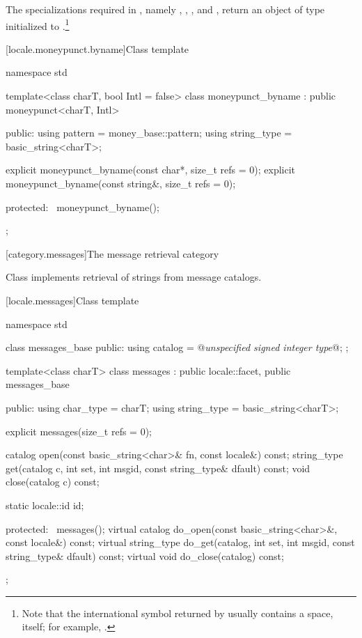 \begin{itemdescr}
\pnum
\returns
The specializations required in , namely
,
,
,
and
,
return an object of type
initialized to
.\footnote{Note that the international
symbol returned by
usually contains a space, itself;
for example, .}
\end{itemdescr}

[locale.moneypunct.byname]{Class template }

%
\begin{codeblock}
namespace std {
  template<class charT, bool Intl = false>
  class moneypunct_byname : public moneypunct<charT, Intl> {
    public:
      using pattern     = money_base::pattern;
      using string_type = basic_string<charT>;

      explicit moneypunct_byname(const char*, size_t refs = 0);
      explicit moneypunct_byname(const string&, size_t refs = 0);

    protected:
      ~moneypunct_byname();
    };
}
\end{codeblock}

[category.messages]{The message retrieval category}

\pnum
Class
implements retrieval of strings from message catalogs.

[locale.messages]{Class template }

%
\begin{codeblock}
namespace std {
  class messages_base {
  public:
    using catalog = @\textit{unspecified signed integer type}@;
  };

  template<class charT>
    class messages : public locale::facet, public messages_base {
    public:
      using char_type   = charT;
      using string_type = basic_string<charT>;

      explicit messages(size_t refs = 0);

      catalog open(const basic_string<char>& fn, const locale&) const;
      string_type get(catalog c, int set, int msgid,
                       const string_type& dfault) const;
      void close(catalog c) const;

      static locale::id id;

    protected:
      ~messages();
      virtual catalog do_open(const basic_string<char>&, const locale&) const;
      virtual string_type do_get(catalog, int set, int msgid,
                                 const string_type& dfault) const;
      virtual void do_close(catalog) const;
    };
}
\end{codeblock}

